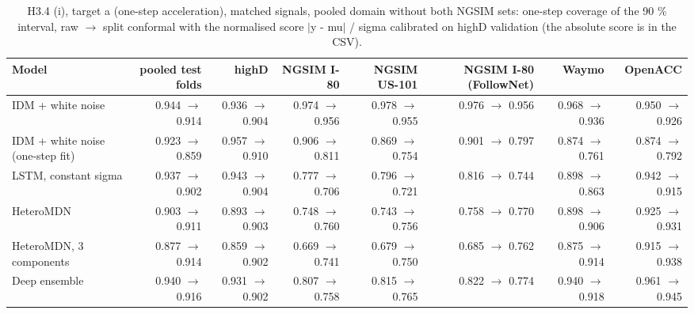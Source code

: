 \begin{table}[htbp]
\centering
\footnotesize
\caption{H3.4 (i), target a (one-step acceleration), matched signals, pooled domain without both NGSIM sets: one-step coverage of the 90 \% interval, raw $\rightarrow$ split conformal with the normalised score $|$y - mu$|$ / sigma calibrated on highD validation (the absolute score is in the CSV).}
\label{tab:t4-onestep-conformal--lodo-ngsim-all--a}
\begin{tabular}{lrrrrrrr}
\toprule
Model & pooled test folds & highD & NGSIM I-80 & NGSIM US-101 & NGSIM I-80 (FollowNet) & Waymo & OpenACC \\
\midrule
IDM + white noise & 0.944 $\rightarrow$ 0.914 & 0.936 $\rightarrow$ 0.904 & 0.974 $\rightarrow$ 0.956 & 0.978 $\rightarrow$ 0.955 & 0.976 $\rightarrow$ 0.956 & 0.968 $\rightarrow$ 0.936 & 0.950 $\rightarrow$ 0.926 \\
IDM + white noise (one-step fit) & 0.923 $\rightarrow$ 0.859 & 0.957 $\rightarrow$ 0.910 & 0.906 $\rightarrow$ 0.811 & 0.869 $\rightarrow$ 0.754 & 0.901 $\rightarrow$ 0.797 & 0.874 $\rightarrow$ 0.761 & 0.874 $\rightarrow$ 0.792 \\
LSTM, constant sigma & 0.937 $\rightarrow$ 0.902 & 0.943 $\rightarrow$ 0.904 & 0.777 $\rightarrow$ 0.706 & 0.796 $\rightarrow$ 0.721 & 0.816 $\rightarrow$ 0.744 & 0.898 $\rightarrow$ 0.863 & 0.942 $\rightarrow$ 0.915 \\
HeteroMDN & 0.903 $\rightarrow$ 0.911 & 0.893 $\rightarrow$ 0.903 & 0.748 $\rightarrow$ 0.760 & 0.743 $\rightarrow$ 0.756 & 0.758 $\rightarrow$ 0.770 & 0.898 $\rightarrow$ 0.906 & 0.925 $\rightarrow$ 0.931 \\
HeteroMDN, 3 components & 0.877 $\rightarrow$ 0.914 & 0.859 $\rightarrow$ 0.902 & 0.669 $\rightarrow$ 0.741 & 0.679 $\rightarrow$ 0.750 & 0.685 $\rightarrow$ 0.762 & 0.875 $\rightarrow$ 0.914 & 0.915 $\rightarrow$ 0.938 \\
Deep ensemble & 0.940 $\rightarrow$ 0.916 & 0.931 $\rightarrow$ 0.902 & 0.807 $\rightarrow$ 0.758 & 0.815 $\rightarrow$ 0.765 & 0.822 $\rightarrow$ 0.774 & 0.940 $\rightarrow$ 0.918 & 0.961 $\rightarrow$ 0.945 \\

\end{tabular}
\end{table}
